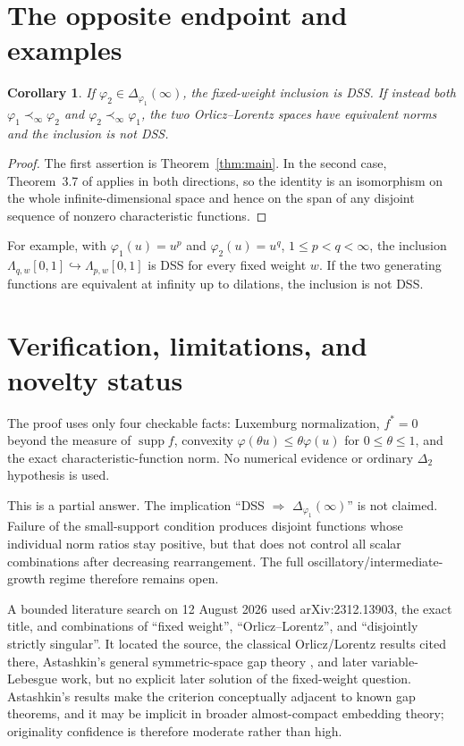 \documentclass[11pt]{article}
\newtheorem{corollary}[theorem]{Corollary}
\newcommand{\Lam}{\Lambda}
\newcommand{\supp}{\operatorname{supp}}
\begin{document}
\section{The opposite endpoint and examples}

\begin{corollary}\label{cor:endpoints}
If $\varphi_2\in\Delta_{\varphi_1}(\infty)$, the fixed-weight inclusion is
DSS.  If instead both $\varphi_1\prec_\infty\varphi_2$ and
$\varphi_2\prec_\infty\varphi_1$, the two Orlicz--Lorentz spaces have
equivalent norms and the inclusion is not DSS.
\end{corollary}

\begin{proof}
The first assertion is Theorem~\ref{thm:main}.  In the second case,
Theorem~3.7 of \cite{source} applies in both directions, so the identity is an
isomorphism on the whole infinite-dimensional space and hence on the span of
any disjoint sequence of nonzero characteristic functions.
\end{proof}

For example, with $\varphi_1(u)=u^p$ and $\varphi_2(u)=u^q$,
$1\leq p<q<\infty$, the inclusion
$\Lam_{q,w}[0,1]\hookrightarrow\Lam_{p,w}[0,1]$ is DSS for every fixed
weight $w$.  If the two generating functions are equivalent at infinity up to
dilations, the inclusion is not DSS.

\section{Verification, limitations, and novelty status}

The proof uses only four checkable facts: Luxemburg normalization,
$f^*=0$ beyond the measure of $\supp f$, convexity
$\varphi(\theta u)\leq\theta\varphi(u)$ for $0\leq\theta\leq1$, and the exact
characteristic-function norm.  No numerical evidence or ordinary
$\Delta_2$ hypothesis is used.

This is a partial answer.  The implication ``DSS $\Rightarrow$
$\Delta_{\varphi_1}(\infty)$'' is not claimed.  Failure of the small-support
condition produces disjoint functions whose individual norm ratios stay
positive, but that does not control all scalar combinations after decreasing
rearrangement.  The full oscillatory/intermediate-growth regime therefore
remains open.

A bounded literature search on 12 August 2026 used arXiv:2312.13903, the exact
title, and combinations of ``fixed weight'', ``Orlicz--Lorentz'', and
``disjointly strictly singular''.  It located the source, the classical
Orlicz/Lorentz results cited there, Astashkin's general symmetric-space gap
theory \cite{astashkin}, and later variable-Lebesgue work, but no explicit
later solution of the fixed-weight question.  Astashkin's results make the
criterion conceptually adjacent to known gap theorems, and it may be implicit
in broader almost-compact embedding theory; originality confidence is
therefore moderate rather than high.
\end{document}
